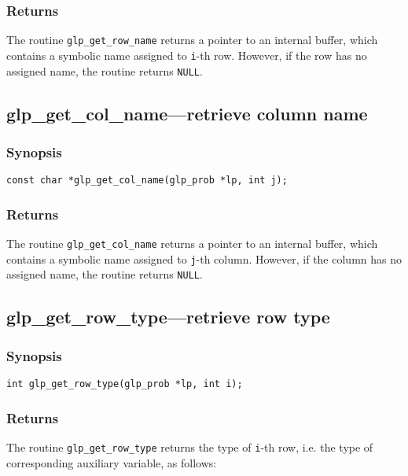 \subsubsection*{Returns}

The routine \verb|glp_get_row_name| returns a pointer to an internal
buffer, which contains a symbolic name assigned to \verb|i|-th row.
However, if the row has no assigned name, the routine returns
\verb|NULL|.

\subsection{glp\_get\_col\_name---retrieve column name}

\subsubsection*{Synopsis}

\begin{verbatim}
const char *glp_get_col_name(glp_prob *lp, int j);
\end{verbatim}

\subsubsection*{Returns}

The routine \verb|glp_get_col_name| returns a pointer to an internal
buffer, which contains a symbolic name assigned to \verb|j|-th column.
However, if the column has no assigned name, the routine returns
\verb|NULL|.

\subsection{glp\_get\_row\_type---retrieve row type}

\subsubsection*{Synopsis}

\begin{verbatim}
int glp_get_row_type(glp_prob *lp, int i);
\end{verbatim}

\subsubsection*{Returns}

The routine \verb|glp_get_row_type| returns the type of \verb|i|-th
row, i.e. the type of corresponding auxiliary variable, as follows:

